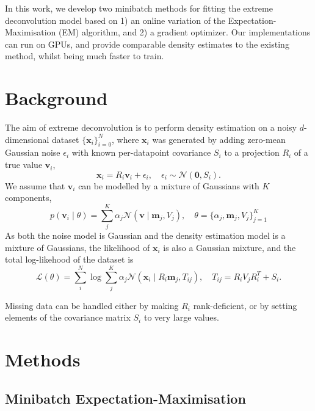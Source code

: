 \documentclass{article}
\newcommand{\bx}{\mathbf{x}}
\newcommand{\bv}{\mathbf{v}}
\newcommand{\bm}{\mathbf{m}}
\begin{document}
In this work, we develop two minibatch methods for fitting the extreme deconvolution model
based on 1) an online variation of the Expectation-Maximisation (EM) algorithm, and 2) a gradient optimizer.
Our implementations can run on GPUs, and provide comparable density estimates to the existing method, whilst being much faster to train.

\section{Background}

The aim of extreme deconvolution is to perform density estimation on a noisy $d$-dimensional dataset $\{\bx_i\}_{i=0}^N$, where $\bx_i$ was generated by adding zero-mean Gaussian noise $\epsilon_i$ with known per-datapoint covariance $S_i$ to a projection $R_i$ of a true value $\bv_i$,
\begin{equation}
  \bx_i = R_i\bv_i + \epsilon_i,\quad  \epsilon_i \sim \mathcal{N}(\mathbf{0}, S_i).
\end{equation}
We assume that $\bv_i$ can be modelled by a mixture of Gaussians with $K$ components,
\begin{equation}
p(\bv_i \mid \theta) = \sum_j^K \alpha_j \mathcal{N}(\bv \mid \bm_j, V_j), \quad \theta = \{\alpha_j, \bm_j, V_j\}_{j=1} ^ K
\end{equation}
As both the noise model is Gaussian and the density estimation model is a mixture of Gaussians, the likelihood of $\bx_i$ is also a Gaussian mixture,
and the total log-likehood of the dataset is
\begin{equation}
\mathcal{L}(\theta) = \sum_i^N \log \sum_j^K \alpha_j\mathcal{N}(\bx_i \mid R_i\bm_j, T_{ij}), \quad T_{ij} = R_iV_jR_i^T + S_i.
\end{equation}

Missing data can be handled either by making $R_i$ rank-deficient, or by setting elements of the covariance matrix $S_i$ to very large values.

\section{Methods}

\subsection{Minibatch Expectation-Maximisation}
\end{document}
